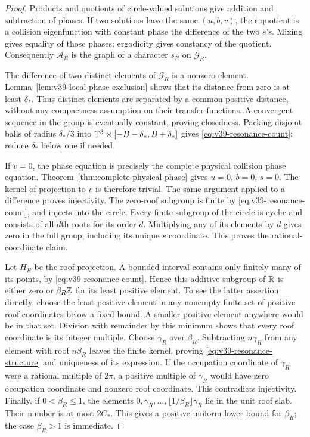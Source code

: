 \begin{proof}
Products and quotients of circle-valued solutions give addition and
subtraction of phases. If two solutions have the same $(u,b,v)$,
their quotient is a collision eigenfunction with constant phase the
difference of the two $s$'s. Mixing gives equality of those phases;
ergodicity gives constancy of the quotient. Consequently
$\mathcal A_R$ is the graph of a character $s_R$ on $\mathcal G_R$.

The difference of two distinct elements of $\mathcal G_R$ is a nonzero
element. Lemma~\ref{lem:v39-local-phase-exclusion} shows that its
distance from zero is at least $\delta_*$. Thus distinct elements are
separated by a common positive distance, without any compactness
assumption on their transfer functions. A convergent sequence in the
group is eventually constant, proving closedness. Packing disjoint
balls of radius $\delta_*/3$ into
$\mathbb T^3\times[-B-\delta_*,B+\delta_*]$ gives
\eqref{eq:v39-resonance-count}; reduce $\delta_*$ below one if needed.

If $v=0$, the phase equation is precisely the complete physical
collision phase equation. Theorem~\ref{thm:complete-physical-phase}
gives $u=0$, $b=0$, $s=0$. The kernel of projection to $v$ is therefore
trivial. The same argument applied to a difference proves injectivity.
The zero-roof subgroup is finite by \eqref{eq:v39-resonance-count},
and injects into the circle. Every finite subgroup of the circle is
cyclic and consists of all $d$th roots for its order $d$. Multiplying
any of its elements by $d$ gives zero in the full group, including
its unique $s$ coordinate. This proves the rational-coordinate claim.

Let $H_R$ be the roof projection. A bounded interval contains only
finitely many of its points, by \eqref{eq:v39-resonance-count}. Hence
this additive subgroup of $\mathbb R$ is either zero or $\beta_R\mathbb Z$ for its
least positive element. To see the latter assertion directly, choose
the least positive element in any nonempty finite set of positive
roof coordinates below a fixed bound. A smaller positive element
anywhere would be in that set. Division with remainder by this minimum
shows that every roof coordinate is its integer multiple.
Choose $\gamma_R$ over $\beta_R$. Subtracting $n\gamma_R$ from any
element with roof $n\beta_R$ leaves the finite kernel, proving
\eqref{eq:v39-resonance-structure} and uniqueness of its expression.
If the occupation coordinate of $\gamma_R$ were a rational multiple
of $2\pi$, a positive multiple of $\gamma_R$ would have zero occupation
coordinate and nonzero roof coordinate. This contradicts injectivity.
Finally, if $0<\beta_R\le1$, the elements
$0,\gamma_R,\ldots,\lfloor1/\beta_R\rfloor\gamma_R$ lie in the
unit roof slab. Their number is at most $2C_*$. This gives a positive
uniform lower bound for $\beta_R$; the case $\beta_R>1$ is immediate.
\end{proof}


